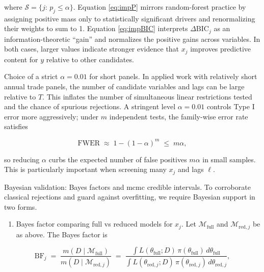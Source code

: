 \documentclass[preprint, 3p,
authoryear]{elsarticle} %
\providecommand{\tightlist}{%
  \setlength{\itemsep}{0pt}\setlength{\parskip}{0pt}}
\begin{document}
\noindent where \(\mathcal{S}=\{j:\,p_j\le \alpha\}\). Equation
\eqref{eq:impP} mirrors random-forest practice by assigning positive
mass only to statistically significant drivers and renormalizing their
weights to sum to 1. Equation \eqref{eq:impBIC} interprets
\(\Delta\mathrm{BIC}_j\) as an information-theoretic ``gain'' and
normalizes the positive gains across variables. In both cases, larger
values indicate stronger evidence that \(x_j\) improves predictive
content for \(y\) relative to other candidates.

Choice of a strict \(\alpha=0.01\) for short panels. In applied work
with relatively short annual trade panels, the number of candidate
variables and lags can be large relative to \(T\). This inflates the
number of simultaneous linear restrictions tested and the chance of
spurious rejections. A stringent level \(\alpha=0.01\) controls Type I
error more aggressively; under \(m\) independent tests, the family-wise
error rate satisfies

\begin{equation}
\mathrm{FWER}\;\approx\; 1-(1-\alpha)^m\;\le\; m\alpha,
\end{equation}

\noindent so reducing \(\alpha\) curbs the expected number of false
positives \(m\alpha\) in small samples. This is particularly important
when screening many \(x_j\) and lags \(\ell\).

Bayesian validation: Bayes factors and \gls{mcmc} credible intervals. To
corroborate classical rejections and guard against overfitting, we
require Bayesian support in two forms.

\begin{enumerate}
\def\labelenumi{(\roman{enumi})}
\tightlist
\item
  Bayes factor comparing full vs reduced models for \(x_j\). Let
  \(\mathcal{M}_{\text{full}}\) and \(\mathcal{M}_{\text{red},j}\) be as
  above. The Bayes factor is
\end{enumerate}

\begin{equation}
\mathrm{BF}_j \;=\; \frac{m\!\left(D\mid \mathcal{M}_{\text{full}}\right)}{m\!\left(D\mid \mathcal{M}_{\text{red},j}\right)}
\;=\; \frac{\displaystyle \int L(\theta_{\text{full}};D)\,\pi(\theta_{\text{full}})\,d\theta_{\text{full}}}{\displaystyle \int L(\theta_{\text{red},j};D)\,\pi(\theta_{\text{red},j})\,d\theta_{\text{red},j}},
\label{eq:bf}
\end{equation}
\end{document}
